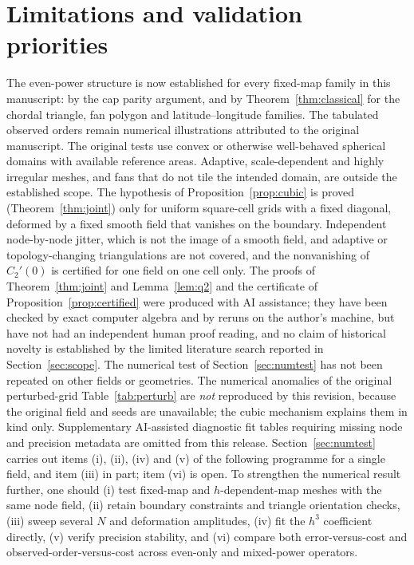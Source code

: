 \documentclass[11pt]{article}
\theoremstyle{remark}
\begin{document}
\section{Limitations and validation priorities}
The even-power structure is now established for every fixed-map family in this manuscript: by
the cap parity argument, and by Theorem~\ref{thm:classical} for the chordal triangle, fan
polygon and latitude--longitude families. The tabulated observed orders remain numerical
illustrations attributed to the original manuscript. The original tests use convex or
otherwise well-behaved spherical domains with available reference areas. Adaptive,
scale-dependent and highly irregular meshes, and fans that do not tile the intended domain,
are outside the established scope. The hypothesis of Proposition~\ref{prop:cubic} is proved (Theorem~\ref{thm:joint}) only for
uniform square-cell grids with a fixed diagonal, deformed by a fixed smooth field that
vanishes on the boundary. Independent node-by-node jitter, which is not the image of a smooth
field, and adaptive or topology-changing triangulations are not covered, and the nonvanishing
of $C_2'(0)$ is certified for one field on one cell only. The proofs of
Theorem~\ref{thm:joint} and Lemma~\ref{lem:q2} and the certificate of
Proposition~\ref{prop:certified} were produced with AI assistance; they have been checked by
exact computer algebra and by reruns on the author's machine, but have not had an independent
human proof reading, and no claim of historical novelty is established by the limited
literature search reported in Section~\ref{sec:scope}. The numerical test of
Section~\ref{sec:numtest} has not been repeated on other fields or geometries. The numerical anomalies of the original perturbed-grid
Table~\ref{tab:perturb} are \emph{not} reproduced by this revision, because the original field
and seeds are unavailable; the cubic mechanism explains them in kind only. Supplementary
AI-assisted diagnostic fit tables requiring missing node and precision metadata are omitted
from this release. Section~\ref{sec:numtest} carries out items (i), (ii), (iv) and (v) of the following programme
for a single field, and item (iii) in part; item (vi) is open. To strengthen the numerical
result further, one should (i) test fixed-map and $h$-dependent-map meshes with the same node field, (ii) retain
boundary constraints and triangle orientation checks, (iii) sweep several $N$ and deformation
amplitudes, (iv) fit the $h^3$ coefficient directly, (v) verify precision stability, and
(vi) compare both error-versus-cost and observed-order-versus-cost across even-only and
mixed-power operators.
\end{document}
